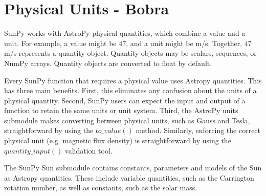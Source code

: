 \section{Physical Units - Bobra}


SunPy works with AstroPy physical quantities, which combine a value and a unit. For example, a value might be $47$, and a unit might be m/s. Together, $47$ m/s represents a quantity object. Quantity objects may be scalars, sequences, or NumPy arrays. Quantity objects are converted to float by default.

Every SunPy function that requires a physical value uses Astropy quantities. This has three main benefits. First, this eliminates any confusion about the units of a physical quantity. Second, SunPy users can expect the input and output of a function to retain the same units or unit system. Third, the AstroPy units submodule makes converting between physical units, such as Gauss and Tesla, straightforward by using the $to\_value()$ method. Similarly, enforcing the correct physical unit (e.g. magnetic flux density) is straightforward by using the $quantity\_input()$ validation tool.

The SunPy Sun submodule contains constants, parameters and models of the Sun as Astropy quantities. These include variable quantities, such as the Carrington rotation number, as well as constants, such as the solar mass. 


